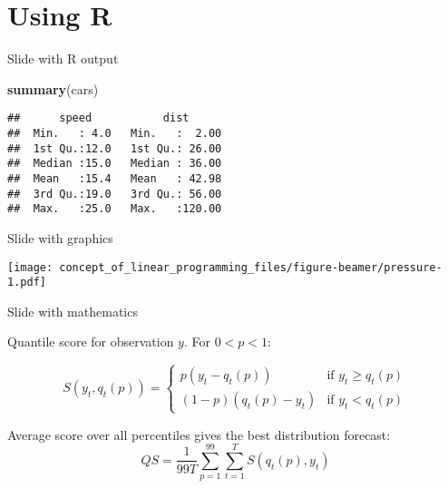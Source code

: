 \documentclass[14pt,ignorenonframetext,compress]{beamer}
\newenvironment{Shaded}{\begin{snugshade}}{\end{snugshade}}
\newcommand{\KeywordTok}[1]{\textcolor[rgb]{0.13,0.29,0.53}{\textbf{#1}}}
\newcommand{\NormalTok}[1]{#1}
\renewenvironment{Shaded}{\color{black}\begin{snugshade}\color{black}}{\end{snugshade}}
\begin{document}
\hypertarget{using-r}{%
\section{Using R}\label{using-r}}

\begin{frame}[fragile]{Slide with R output}
\protect\hypertarget{slide-with-r-output}{}

\begin{Shaded}
\begin{Highlighting}[]
\KeywordTok{summary}\NormalTok{(cars)}
\end{Highlighting}
\end{Shaded}

\begin{verbatim}
##      speed           dist       
##  Min.   : 4.0   Min.   :  2.00  
##  1st Qu.:12.0   1st Qu.: 26.00  
##  Median :15.0   Median : 36.00  
##  Mean   :15.4   Mean   : 42.98  
##  3rd Qu.:19.0   3rd Qu.: 56.00  
##  Max.   :25.0   Max.   :120.00
\end{verbatim}

\end{frame}

\begin{frame}{Slide with graphics}
\protect\hypertarget{slide-with-graphics}{}

\texttt{[image: concept\_of\_linear\_programming\_files/figure-beamer/pressure-1.pdf]}

\end{frame}

\begin{frame}{Slide with mathematics}
\protect\hypertarget{slide-with-mathematics}{}

Quantile score for observation \(y\). For \(0<p<1\):

\begin{block}{}
  \[
    S(y_t,q_t(p)) = \left\{
      \begin{array}{rl}
            p(y_t-q_t(p)) & \text{if $y_t \ge q_t(p)$}\\
        (1-p)(q_t(p)-y_t) & \text{if $y_t < q_t(p)$}
      \end{array}\right.
  \]
\end{block}

Average score over all percentiles gives the best distribution forecast:
\[
  QS = \frac{1}{99T}\sum_{p=1}^{99}\sum_{t=1}^T S(q_t(p),y_t)
\]

\end{frame}
\end{document}
